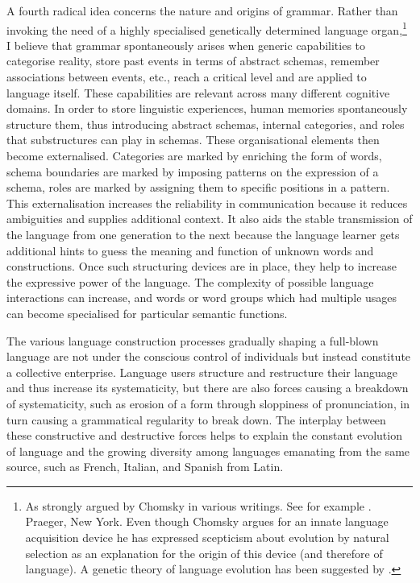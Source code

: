 A fourth radical idea concerns the nature and origins of 
grammar. Rather than invoking the need of a highly 
specialised genetically determined language 
organ,\footnote{
As strongly argued by Chomsky in various writings. 
See for example \cite{Chomsky:1968}. 
Praeger, New York. Even though Chomsky argues for 
an innate language acquisition device he has expressed
scepticism about evolution by natural selection
as an explanation for the 
origin of this device (and therefore of language). 
A genetic theory of language evolution 
has been suggested by \cite{Pinker:1994}.} 
I believe that grammar spontaneously arises when 
generic capabilities to categorise reality, store past
events in terms of abstract schemas, remember associations
between events, etc., reach a critical level and are
applied to language itself. These capabilities are 
relevant across many different cognitive domains. 
In order to store linguistic
experiences, human memories spontaneously structure them, thus 
introducing abstract schemas, internal categories, and 
roles that substructures can play in schemas.
These organisational elements then become externalised. 
Categories are marked by enriching
the form of words, schema boundaries are marked by 
imposing patterns on the expression of a schema, 
roles are marked by assigning
them to specific positions in a 
pattern. This externalisation 
increases the reliability in communication because
it reduces ambiguities and supplies additional context. It 
also aids the stable transmission of the language from one
generation to the next because the language learner
gets additional hints to guess the meaning and function of unknown
words and constructions. 
Once such structuring devices are in place, they help 
to increase the expressive power of the language. The 
complexity of possible language interactions can increase, 
and words or word groups which had multiple usages
can become specialised for particular semantic functions. 

The various language construction processes gradually 
shaping a full-blown language 
are not under the conscious control of individuals but
instead constitute a collective enterprise. Language users 
structure and restructure their language and thus increase its
systematicity, but there are also forces causing a breakdown 
of systematicity, such as erosion of a form 
through sloppiness of pronunciation, in turn causing a grammatical 
regularity to break down. The interplay between 
these constructive and destructive forces helps to explain
the constant evolution of language and the growing 
diversity among languages emanating from the same source, such as
French, Italian, and Spanish from Latin. 

